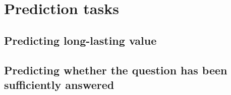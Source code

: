 \section{Prediction tasks}

\subsection{Predicting long-lasting value}

\subsection{Predicting whether the question has been sufficiently answered}